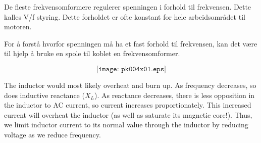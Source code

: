 


De fleste frekvensomformere regulerer spenningen i forhold til frekvensen. Dette kalles V/f styring. Dette forholdet er ofte konstant for hele arbeidsområdet til motoren. 

For å forstå hvorfor spenningen må ha et fast forhold til frekvensen, kan det være til hjelp å bruke en spole til koblet en frekvensomformer. 


$$\texttt{[image: pk004x01.eps]}$$








The inductor would most likely overheat and burn up.  As frequency decreases, so does inductive reactance ($X_L$).  As reactance decreases, there is less opposition in the inductor to AC current, so current increases proportionately.  This increased current will overheat the inductor (as well as saturate its magnetic core!).  Thus, we limit inductor current to its normal value through the inductor by reducing voltage as we reduce frequency.











